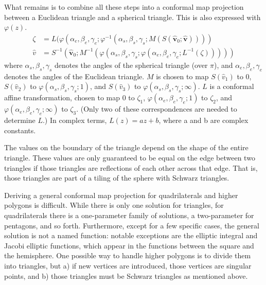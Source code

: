 \documentclass{amsart}[12pt]
\begin{document}
What remains is to combine all these steps into a conformal map projection
between a Euclidean triangle and a spherical triangle. This is also expressed
with $\varphi(z)$.
\begin{equation}\begin{split}\label{eq:conformal}
  \zeta &= L(\varphi\left(\alpha_e,\beta_e,\gamma_e;
    \varphi^{-1}\left(\alpha_s,\beta_s,\gamma_s;
    M(S(\mathbf{\hat{v}}_0;\mathbf{\hat{v}})) \right)\right)\\
  \hat{v} &= S^{-1}\left(\mathbf{\hat{v}}_0;M^{-1}\left(
    \varphi\left(\alpha_s,\beta_s,\gamma_s;
    \varphi\left(\alpha_e,\beta_e,\gamma_e;L^{-1}(\zeta)\right)\right)
  \right)\right)
\end{split}\end{equation}
where $\alpha_s,\beta_s,\gamma_s$ denotes the angles of the spherical triangle
(over $\pi$), and $\alpha_e, \beta_e, \gamma_e$ denotes the angles of the
Euclidean triangle. $M$ is chosen to map
$S(\hat{v}_1)$ to $0$,
$S(\hat{v}_2)$ to $\varphi\left(\alpha_s,\beta_s,\gamma_s;1\right)$, and
$S(\hat{v}_3)$ to $\varphi\left(\alpha_s,\beta_s,\gamma_s;\infty\right)$.
$L$ is a conformal affine transformation, chosen to map
$0$ to $\zeta_1$,
$\varphi\left(\alpha_e,\beta_e,\gamma_e;1\right)$ to $\zeta_2$, and
$\varphi\left(\alpha_e,\beta_e,\gamma_e;\infty\right)$ to $\zeta_3$.
(Only two of these correspondences are needed to determine $L$.)
In complex terms, $L(z)=az + b$, where a and b are complex constants.

The values on the boundary of the triangle depend on the shape of the entire
triangle. These values are only guaranteed to be equal on the edge between two
triangles if those triangles are reflections of each other across that edge.
That is, those triangles are part of a tiling of the sphere with Schwarz
triangles.%

Deriving a general conformal map projection for quadrilaterals and higher
polygons is difficult. While there is only one solution for triangles, for
quadrilaterals there is a one-parameter family of solutions, a two-parameter
for pentagons, and so forth.\cite{nehari57} %
Furthermore, except for a few specific cases, the general solution is not a
named function: notable exceptions are the elliptic integral and Jacobi
elliptic functions, which appear in the functions between the square and the
hemisphere.\cite{fong16}
One possible way to handle higher polygons is to divide them into triangles,
but a) if new vertices are introduced, those vertices are singular points,
and b) those triangles must be Schwarz triangles as mentioned above.
\end{document}
